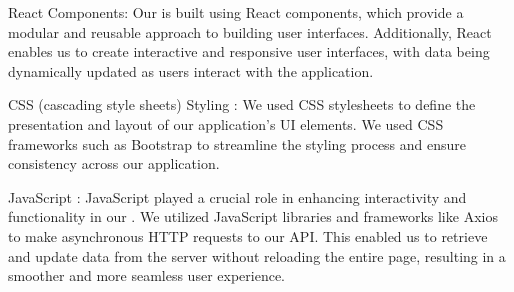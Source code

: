React \cite{react} Components: Our  is built using React \cite{react} components, which provide a modular and reusable approach to building user interfaces. Additionally, React \cite{react} enables us to create interactive and responsive user interfaces, with data being dynamically updated as users interact with the application.

CSS (cascading style sheets) Styling \cite{htmlcssjs}: We used CSS stylesheets to define the presentation and layout of our application's UI elements. We used CSS \cite{htmlcssjs} frameworks such as Bootstrap \cite{boostrap} to streamline the styling process and ensure consistency across our application.

JavaScript \cite{htmlcssjs}: JavaScript played a crucial role in enhancing interactivity and functionality in our . We utilized JavaScript libraries and frameworks like Axios to make asynchronous HTTP requests to our  API. This enabled us to retrieve and update data from the server without reloading the entire page, resulting in a smoother and more seamless user experience.

\par
\hrulefill 

